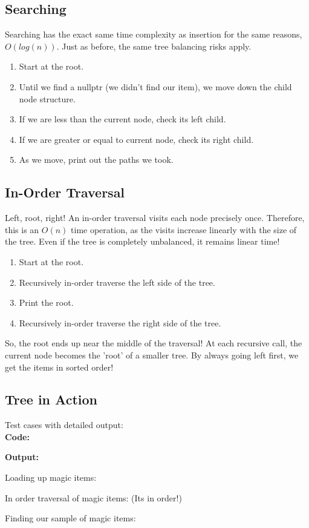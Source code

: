 \documentclass[letterpaper, 10pt]{article}
\begin{document}
\subsection{Searching}
Searching has the exact same time complexity as insertion for the same reasons, $O(log(n))$. Just as before, the same tree balancing risks apply.
\begin{enumerate}
    \item Start at the root.
    \item Until we find a nullptr (we didn't find our item), we move down the child node structure.
    \item If we are less than the current node, check its left child.
    \item If we are greater or equal to current node, check its right child.
    \item As we move, print out the paths we took.
\end{enumerate}


\subsection{In-Order Traversal}
Left, root, right! An in-order traversal visits each node precisely once. Therefore, this is an $O(n)$ time operation, as the visits increase linearly with the size of the tree. Even if the tree is completely unbalanced, it remains linear time!
\begin{enumerate}
    \item Start at the root.
    \item Recursively in-order traverse the left side of the tree.
    \item Print the root.
    \item Recursively in-order traverse the right side of the tree.
\end{enumerate}
So, the root ends up near the middle of the traversal! At each recursive call, the current node becomes the 'root' of a smaller tree. By always going left first, we get the items in sorted order!


\subsection{Tree in Action}
Test cases with detailed output: \\
\textbf{Code:}

\textbf{Output:}

\noindent
Loading up magic items: 

In order traversal of magic items: (Its in order!)

Finding our sample of magic items:

\newpage

\end{document}
